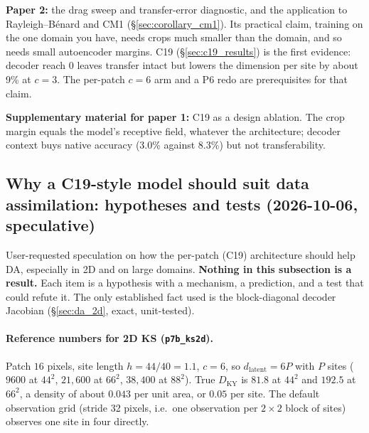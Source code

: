 \documentclass[11pt]{article}
\begin{document}
\textbf{Paper 2:} the drag sweep and transfer-error diagnostic, and the
application to Rayleigh--B\'enard and CM1
(\S\ref{sec:corollary_cm1}). Its practical claim, training on the one
domain you have, needs crops much smaller than the domain, and so needs
small autoencoder margins. C19 (\S\ref{sec:c19_results}) is the first
evidence: decoder reach 0 leaves transfer intact but lowers the
dimension per site by about 9\% at $c{=}3$. The per-patch $c{=}6$ arm
and a P6 redo are prerequisites for that claim.

\textbf{Supplementary material for paper 1:} C19 as a design ablation.
The crop margin equals the model's receptive field, whatever the
architecture; decoder context buys native accuracy (3.0\% against
8.3\%) but not transferability.

\subsection{Why a C19-style model should suit data assimilation:
hypotheses and tests (2026-10-06, speculative)}
\label{sec:c19_da_hypotheses}

User-requested speculation on how the per-patch (C19) architecture should
help DA, especially in 2D and on large domains. \textbf{Nothing in this
subsection is a result.} Each item is a hypothesis with a mechanism, a
prediction, and a test that could refute it. The only established fact
used is the block-diagonal decoder Jacobian (\S\ref{sec:da_2d}, exact,
unit-tested).

\paragraph{Reference numbers for 2D KS (\texttt{p7b\_ks2d}).} Patch $16$
pixels, site length $h{=}44/40{=}1.1$, $c{=}6$, so
$d_{\mathrm{latent}}{=}6P$ with $P$ sites ($9600$ at $44^2$, $21{,}600$ at
$66^2$, $38{,}400$ at $88^2$). True $D_{\mathrm{KY}}$ is $81.8$ at $44^2$
and $192.5$ at $66^2$, a density of about $0.043$ per unit area, or
$0.05$ per site. The default observation grid (stride 32 pixels, i.e.\
one observation per $2{\times}2$ block of sites) observes one site in
four directly.
\end{document}
